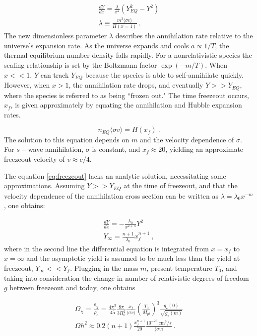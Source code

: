 \begin{align}
    \frac{dY}{dx} = \frac{\lambda}{x^2}(Y_{EQ}^2 - Y^2)\\
    \label{eq:freezeout}
    \lambda \equiv \frac{m^3 \langle\sigma v\rangle}{H(x=1)}~.
\end{align}
\noindent
The new dimensionless parameter $\lambda$ describes the annihilation rate relative to the universe's expansion rate.
As the universe expands and cools $a \propto 1/T$, the thermal equilibrium number density falls rapidly.
For a nonrelativistic species the scaling relationship is set by the Boltzmann factor $\exp(-m/T)$.
When $x <<1$, $Y$ can track $Y_{EQ}$ because the species is able to self-annihilate quickly.
However, when $x>1$, the annihilation rate drops, and eventually $Y>>Y_{EQ}$, where the species is referred to as being ``frozen out."
The time freezeout occurs, $x_f$, is given approximately by equating the annihilation and Hubble expansion rates. 

\begin{equation}
    n_{EQ} \langle \sigma v \rangle = H(x_f)~.
\end{equation}
\noindent
The solution to this equation depends on $m$ and the velocity dependence of $\sigma$.
For $s-$wave annihilation, $\sigma$ is constant, and $x_f \approx 20$, yielding an approximate freezeout velocity of $v \approx c/4$.


The equation \ref{eq:freezeout} lacks an analytic solution, necessitating some approximations.
Assuming $Y>>Y_{EQ}$ at the time of freezeout, and that the velocity dependence of the annihilation cross section can be written as $\lambda=\lambda_0x^{-m}$, 
one obtains: 

\begin{align}
    \frac{dY}{dx} = -\frac{\lambda_0}{x^{2+n}}Y^2 \\
    Y_\infty = \frac{n+1}{\lambda_0}x_f^{n+1} ~,
\end{align}
\noindent
where in the second line the differential equation is integrated from $x = x_f$ to $x=\infty$ and the asymptotic yield is assumed to be much less than the yield at freezeout, $Y_\infty << Y_f$.
Plugging in the mass $m$, present temperature $T_0$, and taking into consideration the change in number of relativistic degrees of freedom $g$ between freezeout and today, one obtains 

\begin{align}
    \Omega_\chi = \frac{\rho_\chi}{\rho_c} = \frac{4 \pi^3}{45} \frac{8 \pi}{3 H_0^2} \frac{x_f}{\langle \sigma v\rangle } (\frac{T_0}{M_{pl}})^3 \frac{g_\star (0)}{\sqrt{g_\star (m)}}\\
    \Omega h^2 \approx 0.2 (n+1)\frac{x_f^{n+1}}{20} \frac{ 10^{-26} \mathrm{~cm}^3/s}{\langle \sigma v \rangle}~.
\end{align}

